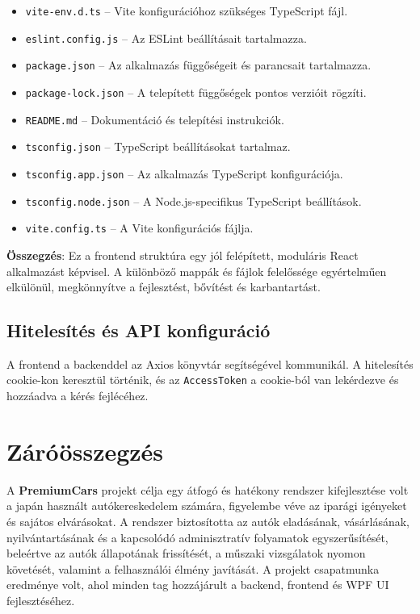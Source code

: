 \documentclass{report}[11pt]
\begin{document}
\begin{itemize}
    \item \texttt{vite-env.d.ts} – Vite konfigurációhoz szükséges TypeScript fájl.
    \item \texttt{eslint.config.js} – Az ESLint beállításait tartalmazza.
    \item \texttt{package.json} – Az alkalmazás függőségeit és parancsait tartalmazza.
    \item \texttt{package-lock.json} – A telepített függőségek pontos verzióit rögzíti.
    \item \texttt{README.md} – Dokumentáció és telepítési instrukciók.
    \item \texttt{tsconfig.json} – TypeScript beállításokat tartalmaz.
    \item \texttt{tsconfig.app.json} – Az alkalmazás TypeScript konfigurációja.
    \item \texttt{tsconfig.node.json} – A Node.js-specifikus TypeScript beállítások.
    \item \texttt{vite.config.ts} – A Vite konfigurációs fájlja.
\end{itemize}

\textbf{Összegzés}:  
Ez a frontend struktúra egy jól felépített, moduláris React alkalmazást képvisel. A különböző mappák és fájlok felelőssége egyértelműen elkülönül, megkönnyítve a fejlesztést, bővítést és karbantartást.



\section{Hitelesítés és API konfiguráció}
A frontend a backenddel az Axios könyvtár segítségével kommunikál. A hitelesítés cookie-kon keresztül történik, és az \texttt{AccessToken} a cookie-ból van lekérdezve és hozzáadva a kérés fejlécéhez.
\chapter{Záróösszegzés}
A \textbf{PremiumCars} projekt célja egy átfogó és hatékony rendszer kifejlesztése volt a japán használt autókereskedelem számára, figyelembe véve az iparági igényeket és sajátos elvárásokat. A rendszer biztosította az autók eladásának, vásárlásának, nyilvántartásának és a kapcsolódó adminisztratív folyamatok egyszerűsítését, beleértve az autók állapotának frissítését, a műszaki vizsgálatok nyomon követését, valamint a felhasználói élmény javítását. A projekt csapatmunka eredménye volt, ahol minden tag hozzájárult a backend, frontend és WPF UI fejlesztéséhez.
\end{document}
